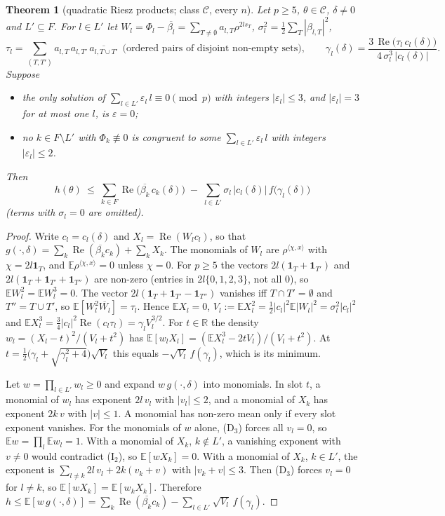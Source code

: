 \documentclass[11pt]{article}
\newtheorem{theorem}{Theorem}
\theoremstyle{definition}
\renewcommand{\Re}{\operatorname{Re}}
\begin{document}
\begin{theorem}[quadratic Riesz products; class $\mathcal C$, every $n$]\label{thm:quad}
Let $p\ge5$, $\theta\in\mathcal C$, $\delta\ne0$ and $L'\subseteq F$.  For $l\in L'$ let
$W_l=\Phi_l-\overline{\beta_l}=\sum_{T\ne\emptyset}a_{l,T}\rho^{2ls_T}$, $\sigma_l^2=\frac12\sum_T|\beta_{l,T}|^2$,
\[\tau_l=\sum_{(T,T')}a_{l,T}\,a_{l,T'}\,\overline{a_{l,T\cup T'}}\ \ \text{(ordered pairs of disjoint non-empty sets)},\qquad
\gamma_l(\delta)=\frac{3\,\Re\big(\tau_l\,c_l(\delta)\big)}{4\,\sigma_l^3\,|c_l(\delta)|}.\]
Suppose
\begin{itemize}
\item[(D$_3$)] the only solution of $\sum_{l\in L'}\varepsilon_l\,l\equiv0\pmod p$ with integers $|\varepsilon_l|\le3$, and $|\varepsilon_l|=3$ for at most one $l$,
is $\varepsilon=0$;
\item[(I$_2$)] no $k\in F\setminus L'$ with $\Phi_k\not\equiv0$ is congruent to some $\sum_{l\in L'}\varepsilon_l\,l$ with integers $|\varepsilon_l|\le2$.
\end{itemize}
Then
\[h(\theta)\ \le\ \sum_{k\in F}\Re\big(\overline{\beta_k}\,c_k(\delta)\big)\;-\;\sum_{l\in L'}\sigma_l\,|c_l(\delta)|\,f\big(\gamma_l(\delta)\big)\]
(terms with $\sigma_l=0$ are omitted).
\end{theorem}
\begin{proof}
Write $c_l=c_l(\delta)$ and $X_l=\Re(W_lc_l)$, so that $g(\cdot,\delta)=\sum_k\Re(\overline{\beta_k}c_k)+\sum_kX_k$.  The monomials of $W_l$ are
$\rho^{\langle\chi,x\rangle}$ with $\chi=2l\mathbf 1_T$, and $\mathbb E\rho^{\langle\chi,x\rangle}=0$ unless $\chi=0$.  For $p\ge5$ the vectors
$2l(\mathbf 1_T+\mathbf 1_{T'})$ and $2l(\mathbf 1_T+\mathbf 1_{T'}+\mathbf 1_{T''})$ are non-zero (entries in $2l\{0,1,2,3\}$, not all $0$), so
$\mathbb EW_l^2=\mathbb EW_l^3=0$.  The vector $2l(\mathbf 1_T+\mathbf 1_{T'}-\mathbf 1_{T''})$ vanishes iff $T\cap T'=\emptyset$ and $T''=T\cup T'$, so $\mathbb E[W_l^2\overline{W_l}]=\tau_l$.  Hence $\mathbb EX_l=0$,
$V_l:=\mathbb EX_l^2=\frac12|c_l|^2\mathbb E|W_l|^2=\sigma_l^2|c_l|^2$ and $\mathbb EX_l^3=\frac34|c_l|^2\Re(c_l\tau_l)=\gamma_lV_l^{3/2}$.  For $t\in\mathbb R$
the density $w_l=(X_l-t)^2/(V_l+t^2)$ has $\mathbb E[w_lX_l]=(\mathbb EX_l^3-2tV_l)/(V_l+t^2)$.  At $t=\frac12\big(\gamma_l+\sqrt{\gamma_l^2+4}\big)\sqrt{V_l}$
this equals $-\sqrt{V_l}\,f(\gamma_l)$, which is its minimum.

Let $w=\prod_{l\in L'}w_l\ge0$ and expand $w\,g(\cdot,\delta)$ into monomials.  In slot $t$, a monomial of $w_l$ has exponent $2l\,v_l$ with
$|v_l|\le2$, and a monomial of $X_k$ has exponent $2k\,v$ with $|v|\le1$.  A monomial has non-zero mean only if every slot exponent
vanishes.  For the monomials of $w$ alone, (D$_3$) forces all $v_l=0$, so $\mathbb Ew=\prod_l\mathbb Ew_l=1$.  With a monomial of $X_k$,
$k\notin L'$, a vanishing exponent with $v\ne0$ would contradict (I$_2$), so $\mathbb E[wX_k]=0$.  With a monomial of $X_k$, $k\in L'$, the
exponent is $\sum_{l\ne k}2l\,v_l+2k(v_k+v)$ with $|v_k+v|\le3$.  Then (D$_3$) forces $v_l=0$ for $l\ne k$, so
$\mathbb E[wX_k]=\mathbb E[w_kX_k]$.  Therefore $h\le\mathbb E[w\,g(\cdot,\delta)]=\sum_k\Re(\overline{\beta_k}c_k)-\sum_{l\in L'}\sqrt{V_l}\,f(\gamma_l)$.
\end{proof}
\end{document}
